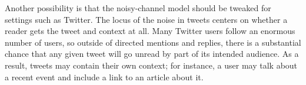 \documentclass[11pt,letterpaper]{article}
\begin{document}
Another possibility is that the noisy-channel model should be tweaked for settings such as Twitter.  The locus of the noise in tweets centers on whether a reader gets the tweet and context at all.  Many Twitter users follow an enormous number of users, so outside of directed mentions and replies, there is a substantial chance that any given tweet will go unread by part of its intended audience. As a result, tweets may contain their own context; for instance, a user may talk about a recent event and include a link to an article about it.  

%

\newpage



\end{document}
